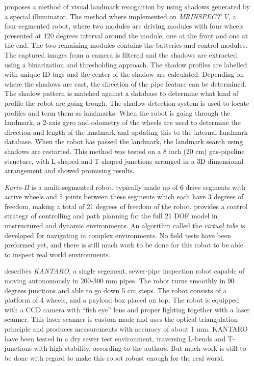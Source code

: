 \cite{MRINSPECT-V} proposes a method of visual landmark recognition by using shadows
generated by a special illuminator. The method where implemented on \emph{MRINSPECT V}, a
four-segmented robot, where two modules are driving modules with four wheels presented at
120 degrees interval around the module, one at the front and one at the end. The two
remaining modules contains the batteries and control modules. 
The captured images from a camera is filtered and the
shadows are extracted using a binarization and thresholding approach. The shadow profiles are
labelled with unique ID-tags and the center of the shadow are calculated. Depending on
where the shadows are cast, the direction of the pipe feature can be determined. The
shadow pattern is matched against a database to determine what kind of profile the robot
are going trough. The shadow detection system is used to locate profiles and term them as
landmarks. When the robot is going through the landmark, a 2-axis gyro and odometry of
the wheels are used to determine the direction and length of the landmark and updating
this to the internal landmark database. When the robot has passed the landmark, the 
landmark search using shadows are restarted. This method was tested on a 8 inch (20 cm)
gas-pipeline structure, with L-shaped and T-shaped junctions arranged in a 3D dimensional
arrangement and showed promising results. 


\emph{Kario-II} is a multi-segmented robot, typically made up of 6 drive segments with
active wheels and 5 joints between these segments which each have 3 degrees of freedom,
making a total of 21 degrees of freedom of the robot. \cite{Kairo-II} provides a control
strategy of controlling and path planning for the full 21 DOF model in unstructured and
dynamic environments. An algorithm called the \emph{virtual tube} is developed for
navigating in complex environments. No field tests have been preformed yet, and there is
still much work to be done for this robot to be able to inspect real world environments. 


\cite{KANTARO} describes \emph{KANTARO}, a single segement, sewer-pipe inspection robot 
capable of moving autonomously in 200-300 mm pipes. The robot turns smoothly in 90 degrees 
junctions and able to go down 5 cm steps. The robot consists of a platform of 4 wheels,
and a payload box placed on top. The robot is equipped with a CCD camera with ``fish eye''
lens and proper lighting together with a laser scanner. This laser scanner is custom made
and uses the optical triangulation principle and produces measurements with accuracy
of about 1 mm. KANTARO have been tested in a dry sewer test environment, traversing
L-bends and T-junctions with high stability, according to the authors. But much work is still
to be done with regard to make this robot robust enough for the real world. 


